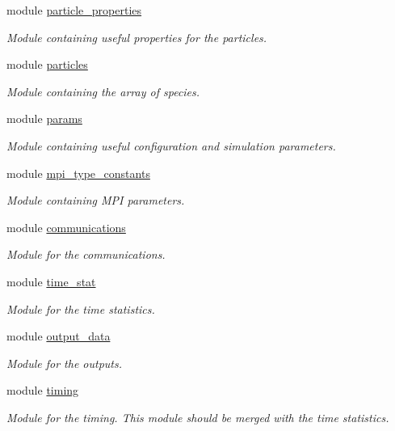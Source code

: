 \begin{DoxyCompactItemize}
module \hyperlink{namespaceparticle__properties}{particle\+\_\+properties}
\begin{DoxyCompactList}\small\item\em Module containing useful properties for the particles. \end{DoxyCompactList}\item 
module \hyperlink{namespaceparticles}{particles}
\begin{DoxyCompactList}\small\item\em Module containing the array of species. \end{DoxyCompactList}\item 
module \hyperlink{namespaceparams}{params}
\begin{DoxyCompactList}\small\item\em Module containing useful configuration and simulation parameters. \end{DoxyCompactList}\item 
module \hyperlink{namespacempi__type__constants}{mpi\+\_\+type\+\_\+constants}
\begin{DoxyCompactList}\small\item\em Module containing M\+PI parameters. \end{DoxyCompactList}\item 
module \hyperlink{namespacecommunications}{communications}
\begin{DoxyCompactList}\small\item\em Module for the communications. \end{DoxyCompactList}\item 
module \hyperlink{namespacetime__stat}{time\+\_\+stat}
\begin{DoxyCompactList}\small\item\em Module for the time statistics. \end{DoxyCompactList}\item 
module \hyperlink{namespaceoutput__data}{output\+\_\+data}
\begin{DoxyCompactList}\small\item\em Module for the outputs. \end{DoxyCompactList}\item 
module \hyperlink{namespacetiming}{timing}
\begin{DoxyCompactList}\small\item\em Module for the timing. This module should be merged with the time statistics. \end{DoxyCompactList}\item 

\end{DoxyCompactItemize}
